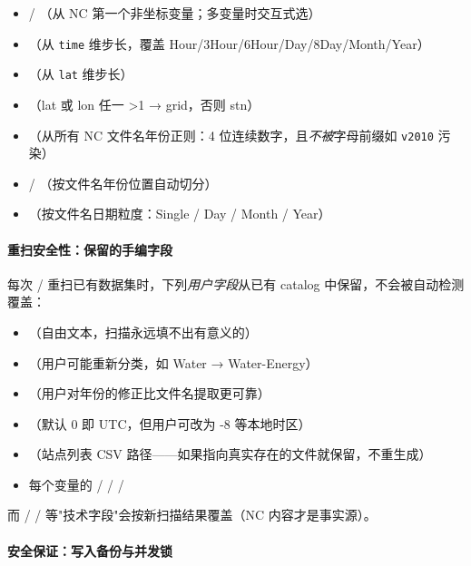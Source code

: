 \begin{itemize}
  \item {} / （从 NC 第一个非坐标变量；多变量时交互式选）
  \item {}（从 \texttt{time} 维步长，覆盖 Hour/3Hour/6Hour/Day/8Day/Month/Year）
  \item {}（从 \texttt{lat} 维步长）
  \item {}（lat 或 lon 任一 >1 → grid，否则 stn）
  \item {}（从所有 NC 文件名年份正则：4 位连续数字，且\emph{不被}字母前缀如 \texttt{v2010} 污染）
  \item {} / （按文件名年份位置自动切分）
  \item {}（按文件名日期粒度：Single / Day / Month / Year）
\end{itemize}

\paragraph{重扫安全性：保留的手编字段}

每次  /  重扫已有数据集时，下列\emph{用户字段}从已有 catalog 中保留，不会被自动检测覆盖：

\begin{itemize}
  \item {}（自由文本，扫描永远填不出有意义的）
  \item {}（用户可能重新分类，如 Water → Water-Energy）
  \item {}（用户对年份的修正比文件名提取更可靠）
  \item {}（默认 0 即 UTC，但用户可改为 -8 等本地时区）
  \item {}（站点列表 CSV 路径——如果指向真实存在的文件就保留，不重生成）
  \item 每个变量的  /  /  / 
\end{itemize}

而  /  /  等"技术字段"会按新扫描结果覆盖（NC 内容才是事实源）。

\paragraph{安全保证：写入备份与并发锁}

